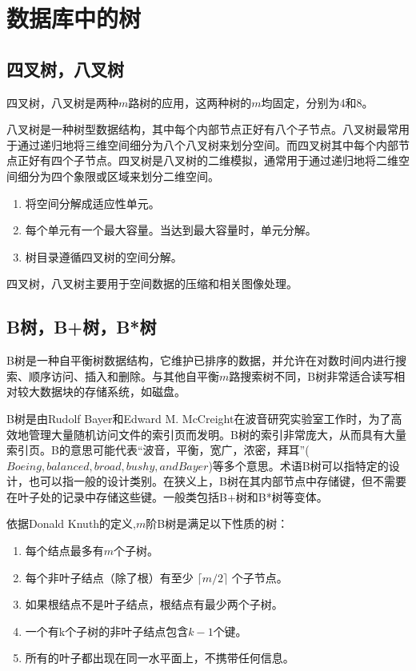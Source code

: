 
\chapter{数据库中的树}

\section{四叉树，八叉树}

四叉树，八叉树是两种$m$路树的应用，这两种树的$m$均固定，分别为4和8。

八叉树是一种树型数据结构，其中每个内部节点正好有八个子节点。八叉树最常用于通过递归地将三维空间细分为八个八叉树来划分空间。而四叉树其中每个内部节点正好有四个子节点。四叉树是八叉树的二维模拟，通常用于通过递归地将二维空间细分为四个象限或区域来划分二维空间。

\begin{enumerate}
	\item 将空间分解成适应性单元。
	\item 每个单元有一个最大容量。当达到最大容量时，单元分解。
	\item 树目录遵循四叉树的空间分解。
\end{enumerate}

四叉树，八叉树主要用于空间数据的压缩和相关图像处理。

\section{B树，B+树，B*树}

B树\cite{enwiki:1024896978}是一种自平衡树数据结构，它维护已排序的数据，并允许在对数时间内进行搜索、顺序访问、插入和删除。与其他自平衡$m$路搜索树不同，B树非常适合读写相对较大数据块的存储系统，如磁盘。

B树是由Rudolf Bayer和Edward M. McCreight在波音研究实验室工作时，为了高效地管理大量随机访问文件的索引页而发明。B树的索引非常庞大，从而具有大量索引页。B的意思可能代表“波音，平衡，宽广，浓密，拜耳”($Boeing, balanced, broad, bushy, and Bayer$)等多个意思。术语B树可以指特定的设计，也可以指一般的设计类别。在狭义上，B树在其内部节点中存储键，但不需要在叶子处的记录中存储这些键。一般类包括B+树和B*树等变体。

依据Donald Knuth的定义,$m$阶B树是满足以下性质的树：

\begin{enumerate}
	\item 每个结点最多有$m$个子树。
	\item 每个非叶子结点（除了根）有至少 $⌈m/2⌉$ 个子节点。
	\item 如果根结点不是叶子结点，根结点有最少两个子树。
	\item 一个有k个子树的非叶子结点包含$k-1$个键。
	\item 所有的叶子都出现在同一水平面上，不携带任何信息。
\end{enumerate}

